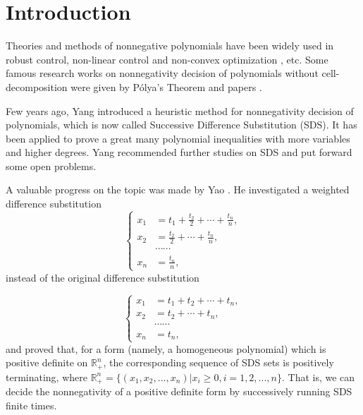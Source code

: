 \documentclass [10pt,a4paper]{article}
\begin{document}
\section{ Introduction }
Theories and methods of nonnegative polynomials have been  widely
used in  robust control, non-linear control and non-convex
optimization \cite{P:1,P:2,J:1}, etc.   Some famous research works
on nonnegativity decision of polynomials without cell-decomposition
were given  by P\'{o}lya's Theorem \cite{Po:1,G:1} and papers
\cite{Ca:1,H:2}.

Few years ago,  Yang \cite{Yang:1,Yang:2,Yang:3} introduced a
heuristic method for nonnegativity  decision of polynomials, which
is now called Successive Dif\mbox{}ference Substitution (SDS). It
has been applied to prove a great many polynomial inequalities with
more variables and higher degrees. Yang recommended  further studies
on
 SDS and  put forward some open problems.

 A valuable progress on the
 topic was made by Yao \cite{Yong:1}.  He investigated a weighted dif\mbox{}ference
 substitution
 \begin{equation} \label{eq:12}
\left\{ \begin{aligned}
         x_1 &= t_1+\frac{t_2}{2}+\cdots+\frac{t_n}{n}, \\
         x_2 &= \frac{t_2}{2}+\cdots+\frac{t_n}{n},\\
             & \cdots\cdots\\
         x_n &= \frac{t_n}{n},
                          \end{aligned} \right.
                         \end{equation}
instead of the  original dif\mbox{}ference
 substitution

 \begin{equation} \label{eq:222}
\left\{ \begin{aligned}
         x_1 &= t_1+t_2+\cdots+t_n, \\
         x_2 &= t_2+\cdots+t_n,\\
             & \cdots\cdots\\
         x_n &= t_n,
                          \end{aligned} \right.
                         \end{equation}
and proved that, for a form (namely, a homogeneous polynomial) which
is positive definite on $\mathbb{R}_+^n$, the corresponding sequence
of SDS sets is positively terminating, where
$\mathbb{R}_+^n=\{(x_1,x_2,...,x_n)|x_i\geq 0, i=1,2,...,n\}.$  That
is,  we can decide the nonnegativity of a positive definite form by
 successively running SDS finite times.
\end{document}
